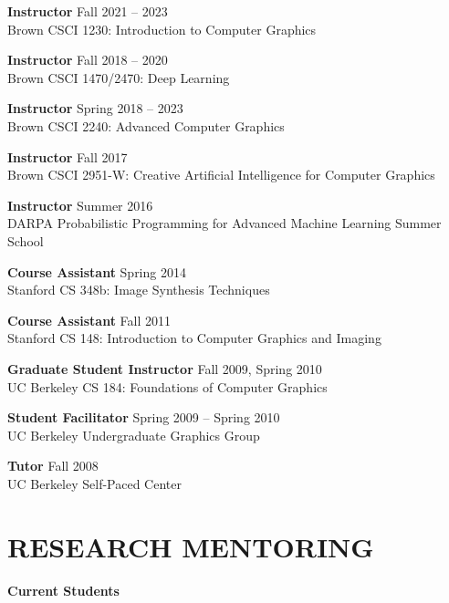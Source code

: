 \documentclass[line,margin]{res}
\begin{document}
\begin{resume}
\newcommand{\teach}[3] {
	\textbf{#1} \hfill #3\\
	#2
}

\teach
{Instructor}
{Brown CSCI 1230: Introduction to Computer Graphics}
{Fall 2021 -- 2023}

\teach
{Instructor}
{Brown CSCI 1470/2470: Deep Learning}
{Fall 2018 -- 2020}

\teach
{Instructor}
{Brown CSCI 2240: Advanced Computer Graphics}
{Spring 2018 -- 2023}

\teach
{Instructor}
{Brown CSCI 2951-W: Creative Artificial Intelligence for Computer Graphics}
{Fall 2017}

\teach
{Instructor}
{DARPA Probabilistic Programming for Advanced Machine Learning Summer School}
{Summer 2016}

\teach
{Course Assistant}
{Stanford CS 348b: Image Synthesis Techniques}
{Spring 2014}

\teach
{Course Assistant}
{Stanford CS 148: Introduction to Computer Graphics and Imaging}
{Fall 2011}

\teach
{Graduate Student Instructor}
{UC Berkeley CS 184: Foundations of Computer Graphics}
{Fall 2009, Spring 2010}

\teach
{Student Facilitator}
{UC Berkeley Undergraduate Graphics Group}
{Spring 2009 -- Spring 2010}

\teach
{Tutor}
{UC Berkeley Self-Paced Center}
{Fall 2008}


\section{RESEARCH MENTORING}

\newcommand{\currentphd}[2] {
	#1 \hfill #2
}

\newcommand{\student}[3] {
	#1 \hfill #2 (expected #3)
}

\newcommand{\alumni}[4] {
	#1 \hfill #2 #3\\
	\emph{Next position: #4}
}

\newcommand{\visitor}[4] {
	#1 \hfill #2 #3\\
	\emph{Home institution: #4}
}

\newcommand{\thesiscomm}[3] {
	#1 \hfill #2\\
	\emph{#3}
}


\textbf{Current Students}


\end{resume}
\end{document}
